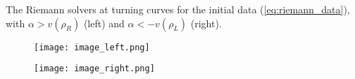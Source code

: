 \documentclass[10pt]{article}
\begin{document}
The Riemann solvers at turning curves for the initial data (\ref{eq:riemann_data}), with $\alpha > v(\rho_R)$ (left) and $\alpha < -v(\rho_L)$ (right).

\begin{figure}[h]
    \centering
    \texttt{[image: image\_left.png]}
\end{figure}

\begin{figure}[h]
    \centering
    \texttt{[image: image\_right.png]}
\end{figure}
\end{document}
